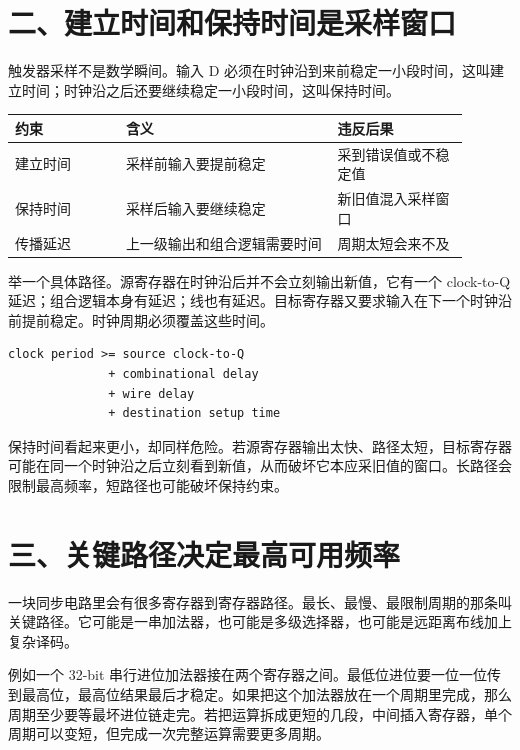 \section{二、建立时间和保持时间是采样窗口}

触发器采样不是数学瞬间。输入 D 必须在时钟沿到来前稳定一小段时间，这叫建立时间；时钟沿之后还要继续稳定一小段时间，这叫保持时间。

\begin{longtable}{p{0.22\linewidth}p{0.42\linewidth}p{0.26\linewidth}}
\toprule
约束 & 含义 & 违反后果 \\
\midrule
建立时间 & 采样前输入要提前稳定 & 采到错误值或不稳定值 \\
保持时间 & 采样后输入要继续稳定 & 新旧值混入采样窗口 \\
传播延迟 & 上一级输出和组合逻辑需要时间 & 周期太短会来不及 \\
\bottomrule
\end{longtable}

举一个具体路径。源寄存器在时钟沿后并不会立刻输出新值，它有一个 clock-to-Q 延迟；组合逻辑本身有延迟；线也有延迟。目标寄存器又要求输入在下一个时钟沿前提前稳定。时钟周期必须覆盖这些时间。

\begin{lstlisting}
clock period >= source clock-to-Q
              + combinational delay
              + wire delay
              + destination setup time
\end{lstlisting}

保持时间看起来更小，却同样危险。若源寄存器输出太快、路径太短，目标寄存器可能在同一个时钟沿之后立刻看到新值，从而破坏它本应采旧值的窗口。长路径会限制最高频率，短路径也可能破坏保持约束。

\section{三、关键路径决定最高可用频率}

一块同步电路里会有很多寄存器到寄存器路径。最长、最慢、最限制周期的那条叫关键路径。它可能是一串加法器，也可能是多级选择器，也可能是远距离布线加上复杂译码。

例如一个 32-bit 串行进位加法器接在两个寄存器之间。最低位进位要一位一位传到最高位，最高位结果最后才稳定。如果把这个加法器放在一个周期里完成，那么周期至少要等最坏进位链走完。若把运算拆成更短的几段，中间插入寄存器，单个周期可以变短，但完成一次完整运算需要更多周期。

